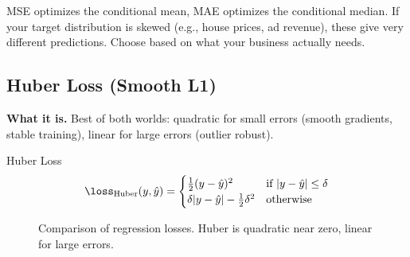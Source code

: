 \begin{warningbox}
MSE optimizes the conditional mean, MAE optimizes the conditional median. If your target distribution is skewed (e.g., house prices, ad revenue), these give very different predictions. Choose based on what your business actually needs.
\end{warningbox}

\subsection{Huber Loss (Smooth L1)}

\textbf{What it is.} Best of both worlds: quadratic for small errors (smooth gradients, stable training), linear for large errors (outlier robust).

\begin{mathresult}{Huber Loss}
\begin{equation}
\loss_{\text{Huber}}(y, \hat{y}) = \begin{cases}
\frac{1}{2}(y - \hat{y})^2 & \text{if } |y - \hat{y}| \leq \delta \\
\delta|y - \hat{y}| - \frac{1}{2}\delta^2 & \text{otherwise}
\end{cases}
\end{equation}
\end{mathresult}

\begin{figure}[H]
\centering
{}
\caption{Comparison of regression losses. Huber is quadratic near zero, linear for large errors.}
\end{figure}

